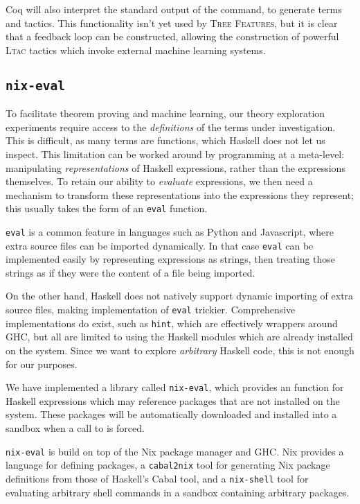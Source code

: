 Coq will also interpret the standard output of the command, to generate terms and tactics. This functionality isn't yet used by \textsc{Tree Features}, but it is clear that a feedback loop can be constructed, allowing the construction of powerful \textsc{Ltac} tactics which invoke external machine learning systems.

\subsection{\texttt{nix-eval}}
\label{sec:nixeval}

To facilitate theorem proving and machine learning, our theory exploration experiments require access to the \emph{definitions} of the terms under investigation. This is difficult, as many terms are functions, which Haskell does not let us inspect. This limitation can be worked around by programming at a meta-level: manipulating \emph{representations} of Haskell expressions, rather than the expressions themselves. To retain our ability to \emph{evaluate} expressions, we then need a mechanism to transform these representations into the expressions they represent; this usually takes the form of an \texttt{eval} function.

\texttt{eval} is a common feature in languages such as Python and Javascript, where extra source files can be imported dynamically. In that case \texttt{eval} can be implemented easily by representing expressions as strings, then treating those strings as if they were the content of a file being imported.

On the other hand, Haskell does not natively support dynamic importing of extra source files, making implementation of \texttt{eval} trickier. Comprehensive implementations do exist, such as \texttt{hint}, which are effectively wrappers around GHC, but all are limited to using the Haskell modules which are already installed on the system. Since we want to explore \emph{arbitrary} Haskell code, this is not enough for our purposes.

We have implemented a library called \texttt{nix-eval}, which provides an  function for Haskell expressions which may reference packages that are not installed on the system. These packages will be automatically downloaded and installed into a sandbox when a call to  is forced.

\texttt{nix-eval} is build on top of the Nix package manager and GHC. Nix provides a language for defining packages, a \texttt{cabal2nix} tool for generating Nix package definitions from those of Haskell's Cabal tool, and a \texttt{nix-shell} tool for evaluating arbitrary shell commands in a sandbox containing arbitrary packages.

